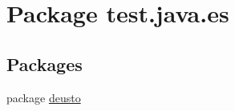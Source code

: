 \hypertarget{namespacetest_1_1java_1_1es}{}\section{Package test.\+java.\+es}
\label{namespacetest_1_1java_1_1es}
\subsection*{Packages}
\begin{DoxyCompactItemize}
\item 
package \hyperlink{namespacetest_1_1java_1_1es_1_1deusto}{deusto}
\end{DoxyCompactItemize}
